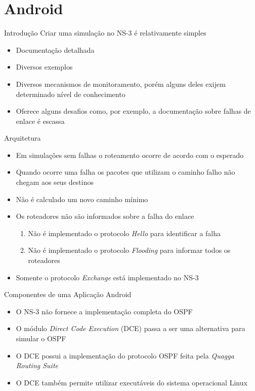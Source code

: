 \documentclass{beamer}
\newlength{\wideitemsep}
\let\olditem\item
\renewcommand{\item}{\setlength{\itemsep}{\wideitemsep}\olditem}
\begin{document}
\section{Android} %
\begin{frame}{Introdução}
Criar uma simulação no NS-3 é relativamente simples
\begin{itemize}
 \item Documentação detalhada %
 \item Diversos exemplos %
 \item Diversos mecanismos de monitoramento, porém alguns deles exijem determinado nível de conhecimento %
 \item Oferece alguns desafios como, por exemplo, a documentação sobre falhas de enlace é escassa %
\end{itemize}
\end{frame}

\begin{frame}{Arquitetura}
\begin{itemize}
 \item Em simulações sem falhas o roteamento ocorre de acordo com o esperado %
 \item Quando ocorre uma falha os pacotes que utilizam o caminho falho não chegam aos seus destinos %
 \item Não é calculado um novo caminho mínimo %
 \item Os roteadores não são informados sobre a falha do enlace %
  \begin{enumerate}
   \olditem Não é implementado o protocolo \textit{Hello} para identificar a falha %
   \olditem Não é implementado o protocolo \textit{Flooding} para informar todos os roteadores %
  \end{enumerate}
 \item Somente o protocolo \textit{Exchange} está implementado no NS-3 %
\end{itemize}
\end{frame}

\begin{frame}{Componentes de uma Aplicação Android}
\begin{itemize}
 \item O NS-3 não fornece a implementação completa do OSPF %
 \item O módulo \textit{Direct Code Execution} (DCE) passa a ser uma alternativa para simular o OSPF %
 \item O DCE possui a implementação do protocolo OSPF feita pela \textit{Quagga Routing Suite} %
 \item O DCE também permite utilizar executáveis do sistema operacional Linux %
\end{itemize}
\end{frame}
\end{document}
